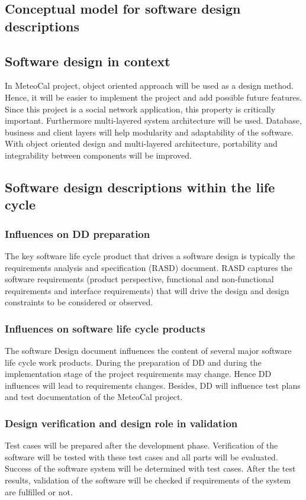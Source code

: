 \newpage

\begin{center}
\section{Conceptual model for software design descriptions}
\end{center}

\subsection{Software design in context}
\par In MeteoCal project, object oriented approach will be used as a design method. Hence, it will be easier to implement the project and add possible future features. Since this project is a social network application, this property is critically important. Furthermore multi-layered system architecture will be used. Database, business and client layers will help modularity and adaptability of the software. With object oriented design and multi-layered architecture, portability and integrability between components will be improved.

\subsection{Software design descriptions within the life cycle}
\subsubsection{Influences on DD preparation}
\par The key software life cycle product that drives a software design is typically the requirements analysis and specification (RASD) document. RASD captures the software requirements (product perspective, functional and non-functional requirements and interface requirements) that will drive the design and design constraints to be considered or observed.
\subsubsection{Influences on software life cycle products}
\par The software Design document influences the content of several major software life cycle work products. During the preparation of DD and during the implementation stage of the project requirements may change. Hence DD influences will lead to requirements changes. Besides, DD will influence test plans and test documentation of the MeteoCal project.
\subsubsection{Design verification and design role in validation}
\par Test cases will be prepared after the development phase. Verification of the software will be tested with these test cases and all parts will be evaluated. Success of the software system will be determined with test cases. After the test results, validation of the software will be checked if requirements of the system are fulfilled or not.
